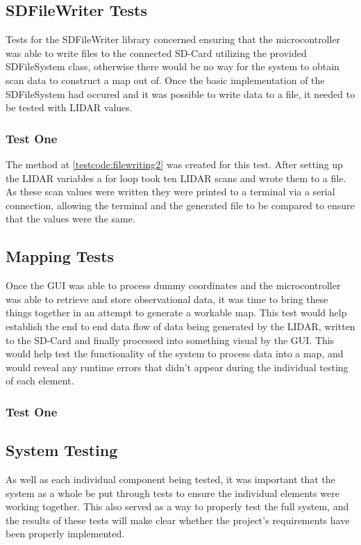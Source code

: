 			\subsection{SDFileWriter Tests}
			Tests for the SDFileWriter library concerned ensuring that the microcontroller was able to write files to the connected SD-Card utilizing the provided SDFileSystem class, otherwise there would be no way for the system to obtain scan data to construct a map out of. Once the basic implementation of the SDFileSystem had occured and it was possible to write data to a file, it needed to be tested with LIDAR values.
				
				\subsubsection{Test One}
				The method at \ref{testcode:filewriting2} was created for this test. After setting up the LIDAR variables a for loop took ten LIDAR scans and wrote them to a file. As these scan values were written they were printed to a terminal via a serial connection, allowing the terminal and the generated file to be compared to ensure that the values were the same.
				
			\subsection{Mapping Tests}
			Once the GUI was able to process dummy coordinates and the microcontroller was able to retrieve and store observational data, it was time to bring these things together in an attempt to generate a workable map. This test would help establish the end to end data flow of data being generated by the LIDAR, written to the SD-Card and finally processed into something visual by the GUI. This would help test the functionality of the system to process data into a map, and would reveal any runtime errors that didn't appear during the individual testing of each element.
				
				\subsubsection{Test One}
			
			\subsection{System Testing}
			As well as each individual component being tested, it was important that the system as a whole be put through tests to ensure the individual elements were working together. This also served as a way to properly test the full system, and the results of these tests will make clear whether the project's requirements have been properly implemented.
			
